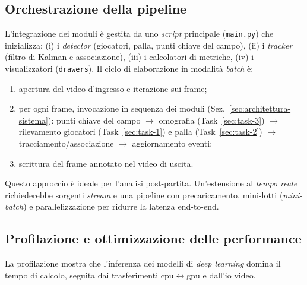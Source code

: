 \documentclass[12pt,a4paper,openright,twoside]{book}
\begin{document}
\subsection{Orchestrazione della pipeline}
\label{subsec:orchestrazione-pipeline}

L'integrazione dei moduli è gestita da uno \emph{script} principale (\texttt{main.py}) che
inizializza: (i) i \emph{detector} (giocatori, palla, punti chiave del campo),
(ii) i \emph{tracker} (filtro di Kalman e associazione), (iii) i calcolatori di metriche,
(iv) i visualizzatori (\texttt{drawers}). Il ciclo di elaborazione in modalità \emph{batch} è:

\begin{enumerate}
  \item apertura del video d'ingresso e iterazione sui frame;
  \item per ogni frame, invocazione in sequenza dei moduli (Sez.~\ref{sec:architettura-sistema}):
  punti chiave del campo $\rightarrow$ omografia (Task~\ref{sec:task-3}) $\rightarrow$
  rilevamento giocatori (Task~\ref{sec:task-1}) e palla (Task~\ref{sec:task-2}) $\rightarrow$
  tracciamento/associazione $\rightarrow$ aggiornamento eventi;
  \item scrittura del frame annotato nel video di uscita.
\end{enumerate}

Questo approccio è ideale per l'analisi post-partita. Un'estensione al \emph{tempo reale}
richiederebbe sorgenti \emph{stream} e una pipeline con precaricamento, mini-lotti (\emph{mini-batch})
e parallelizzazione per ridurre la latenza end-to-end.

\subsection{Profilazione e ottimizzazione delle performance}
\label{sec:profilazione-ottimizzazione}

La profilazione mostra che l'inferenza dei modelli di \emph{deep learning} domina il tempo
di calcolo, seguita dai trasferimenti \ac{cpu}$\leftrightarrow$\ac{gpu} e dall'\ac{io} video.
\end{document}
